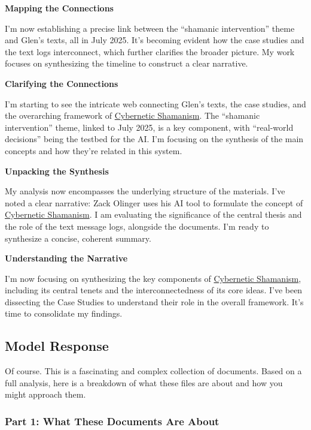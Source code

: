 \documentclass{article}
\begin{document}
\textbf{Mapping the Connections}

I'm now establishing a precise link between the ``shamanic intervention'' theme and Glen's texts, all in July 2025. It's becoming evident how the case studies and the text logs interconnect, which further clarifies the broader picture. My work focuses on synthesizing the timeline to construct a clear narrative.

\textbf{Clarifying the Connections}

I'm starting to see the intricate web connecting Glen's texts, the case studies, and the overarching framework of \hyperlink{gloss:cybernetic_shamanism}{Cybernetic Shamanism}. The ``shamanic intervention'' theme, linked to July 2025, is a key component, with ``real-world decisions'' being the testbed for the AI. I'm focusing on the synthesis of the main concepts and how they're related in this system.

\textbf{Unpacking the Synthesis}

My analysis now encompasses the underlying structure of the materials. I've noted a clear narrative: Zack Olinger uses his AI tool to formulate the concept of \hyperlink{gloss:cybernetic_shamanism}{Cybernetic Shamanism}. I am evaluating the significance of the central thesis and the role of the text message logs, alongside the documents. I'm ready to synthesize a concise, coherent summary.

\textbf{Understanding the Narrative}

I'm now focusing on synthesizing the key components of \hyperlink{gloss:cybernetic_shamanism}{Cybernetic Shamanism}, including its central tenets and the interconnectedness of its core ideas. I've been dissecting the Case Studies to understand their role in the overall framework. It's time to consolidate my findings.

\subsection*{Model Response}\label{model-response}

Of course. This is a fascinating and complex collection of documents. Based on a full analysis, here is a breakdown of what these files are about and how you might approach them.

\subsubsection*{\texorpdfstring{\textbf{Part 1: What These Documents Are About}}{Part 1: What These Documents Are About}}\label{part-1-what-these-documents-are-about}
\end{document}
